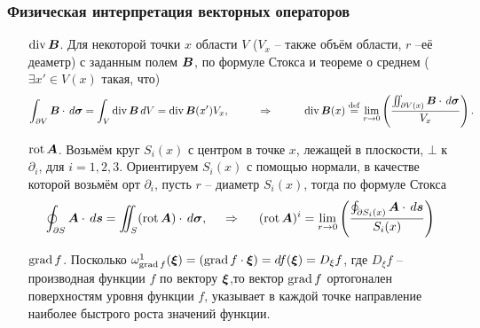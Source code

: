 \subsubsection*{Физическая интерпретация векторных операторов}

\begin{itemize}
    \item[$\mathop{\mathrm{div}}\nolimits \mbox{\boldmath $B$}$.] 
    Для некоторой точки $x$ области $V$ ($V_x$ -- также объём области, $r$ --её деаметр) с заданным полем $\mbox{\boldmath $B$}$, по формуле Стокса и теореме о среднем ($\exists x' \in V(x) $ такая, что)
\begin{equation*}
    \int_{\partial V} \mbox{\boldmath $B$} \cdot \, d \mbox{\boldmath $\sigma$} = 
    \int_V \mathop{\mathrm{div}}\nolimits \mbox{\boldmath $B$} \, d V = \mathop{\mathrm{div}}\nolimits \mbox{\boldmath $B$}(x')V_x,
    \hspace{1cm} \Rightarrow \hspace{1cm} 
    \mathop{\mathrm{div}}\nolimits \mbox{\boldmath $B$}(x) \overset{\mathrm{def}}{=} 
    \lim_{r \to 0} \left(\frac{
                \iint_{\partial V(x)} \mbox{\boldmath $B$} \cdot \, d \mbox{\boldmath $\sigma$}
            }{
                V_x
            }\right).
\end{equation*}
\item[$\mathop{\mathrm{rot}}\nolimits \mbox{\boldmath $A$}$.] 
    Возьмём круг $S_i (x)$ с центром в точке $x$, лежащей в плоскости, $\bot$ к $\partial_i$, для $i = 1, 2, 3$. Ориентируем $S_i(x)$ с помощью нормали, в качестве которой возьмём орт $\partial_i$, пусть $r$ -- диаметр $S_i(x)$, тогда по формуле Стокса
    \begin{equation*}
        \oint_{\partial S} \mbox{\boldmath $A$} \cdot \, d \mbox{\boldmath $s$} = \iint_S (\mathop{\mathrm{rot}}\nolimits \mbox{\boldmath $A$}) \cdot \, d \mbox{\boldmath $\sigma$},
        \hspace{0.5cm} \Rightarrow \hspace{0.5cm}   
        (\mathop{\mathrm{rot}}\nolimits \mbox{\boldmath $A$})^i = 
        \lim_{r \to 0}
        \left(
            \frac{
            \oint_{\partial S_i(x)} \mbox{\boldmath $A$} \cdot \, d \mbox{\boldmath $s$}
            }{
            S_i(x)
            } 
        \right)
    \end{equation*}
\item[$\mathop{\mathrm{grad}}\nolimits f$.] Посколько $\omega^1_{\mathop{\mathrm{grad}}\nolimits f} (\mbox{\boldmath $\xi$}) = (\mathop{\mathrm{grad}}\nolimits f \cdot \mbox{\boldmath $\xi$}) = d f(\mbox{\boldmath $\xi$}) = D_{{\xi}}f$, где $D_{{\xi}}f$ -- производная функции $f$ по вектору $\mbox{\boldmath $\xi$}$,то вектор $\mathop{\mathrm{grad}}\nolimits f$ ортогонален поверхностям уровня функции $f$, указывает в каждой точке направление наиболее быстрого роста значений функции.
\end{itemize}

